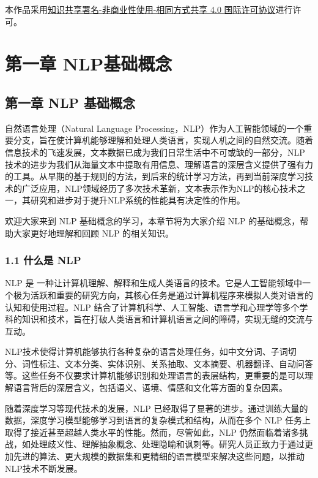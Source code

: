 \documentclass[12pt,a4paper]{book}
\begin{document}
本作品采用\href{http://creativecommons.org/licenses/by-nc-sa/4.0/}{知识共享署名-非商业性使用-相同方式共享
4.0 国际许可协议}进行许可。

\chapter{第一章 NLP基础概念}
{
\setcounter{tocdepth}{3}
\tableofcontents
}
\section{第一章 NLP
基础概念}\label{ux7b2cux4e00ux7ae0-nlp-ux57faux7840ux6982ux5ff5}

自然语言处理（Natural Language
Processing，NLP）作为人工智能领域的一个重要分支，旨在使计算机能够理解和处理人类语言，实现人机之间的自然交流。随着信息技术的飞速发展，文本数据已成为我们日常生活中不可或缺的一部分，NLP技术的进步为我们从海量文本中提取有用信息、理解语言的深层含义提供了强有力的工具。从早期的基于规则的方法，到后来的统计学习方法，再到当前深度学习技术的广泛应用，NLP领域经历了多次技术革新，文本表示作为NLP的核心技术之一，其研究和进步对于提升NLP系统的性能具有决定性的作用。

欢迎大家来到 NLP 基础概念的学习，本章节将为大家介绍 NLP
的基础概念，帮助大家更好地理解和回顾 NLP 的相关知识。

\subsection{1.1 什么是 NLP}\label{ux4ec0ux4e48ux662f-nlp}

NLP 是
一种让计算机理解、解释和生成人类语言的技术。它是人工智能领域中一个极为活跃和重要的研究方向，其核心任务是通过计算机程序来模拟人类对语言的认知和使用过程。NLP
结合了计算机科学、人工智能、语言学和心理学等多个学科的知识和技术，旨在打破人类语言和计算机语言之间的障碍，实现无缝的交流与互动。

NLP技术使得计算机能够执行各种复杂的语言处理任务，如中文分词、子词切分、词性标注、文本分类、实体识别、关系抽取、文本摘要、机器翻译、自动问答等。这些任务不仅要求计算机能够识别和处理语言的表层结构，更重要的是可以理解语言背后的深层含义，包括语义、语境、情感和文化等方面的复杂因素。

随着深度学习等现代技术的发展，NLP
已经取得了显著的进步。通过训练大量的数据，深度学习模型能够学习到语言的复杂模式和结构，从而在多个
NLP 任务上取得了接近甚至超越人类水平的性能。然而，尽管如此，NLP
仍然面临着诸多挑战，如处理歧义性、理解抽象概念、处理隐喻和讽刺等。研究人员正致力于通过更加先进的算法、更大规模的数据集和更精细的语言模型来解决这些问题，以推动NLP技术不断发展。
\end{document}
